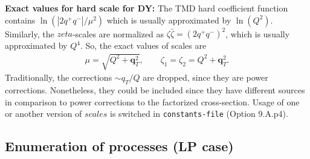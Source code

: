 \documentclass[prd,nofootinbib,eqsecnum,final]{revtex4}
\renewcommand{\(}{\left(}
\renewcommand{\)}{\right)}
\renewcommand{\[}{\left[}
\renewcommand{\]}{\right]}
\renewcommand{\vec}[1]{\bm{#1}}
\begin{document}
\textbf{Exact values for hard scale for DY:} The TMD hard coefficient function contains $\ln(|2q^+q^-|/\mu^2)$ which is usually approximated by $\ln(Q^2)$. Similarly, the $zeta$-scales are normalized as $\zeta \bar \zeta=(2q^+q^-)^2$, which is usually approximated by $Q^4$. So, the exact values of scales are
\begin{eqnarray}
\mu=\sqrt{Q^2+\vec q_T^2},\qquad \zeta_1=\zeta_2=Q^2+\vec q_T^2.
\end{eqnarray}
Traditionally, the corrections $\sim q_T/Q$ are dropped, since they are power corrections. Nonetheless, they could be included since they have different sources in comparison to power corrections to the factorized cross-section. Usage of one or another version of $scales$ is switched in \texttt{constants-file} (Option 9.A.p4).


\subsection{Enumeration of processes (LP case)}
\end{document}
